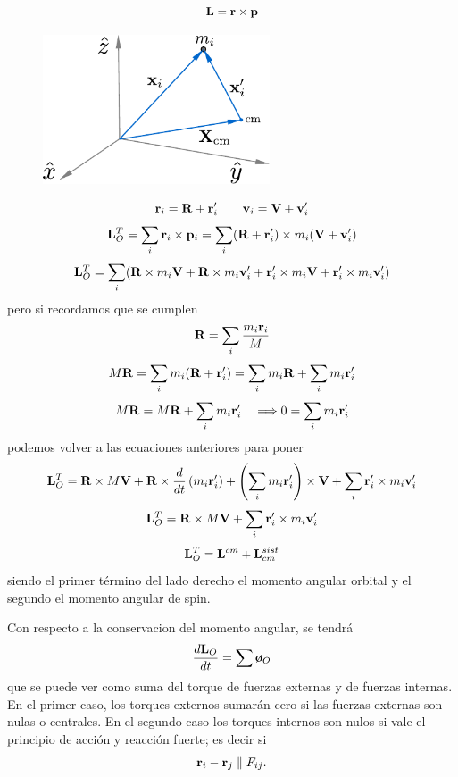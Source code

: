 \documentclass[10pt,oneside]{CBFT_book}
\begin{document}
\[
	\vb{L} = \vb{r} \times \vb{p}
\]
\begin{figure}[hbt]
	\begin{center}
	\includegraphics[width=0.6\textwidth]{images/fig_mc_angularmom.pdf}	
	\end{center}
	\caption{}
\end{figure} 
\[
	\vb{r}_i = \vb{R} + \vb{r}_i' \qquad \vb{v}_i = \vb{V} + \vb{v}_i'
\]
\[
	\vb{L}^T_O = \sum_i \vb{r}_i \times \vb{p}_i = \sum_i (\vb{R} + \vb{r}_i') \times m_i (\vb{V} + \vb{v}_i')
\]
\[
	\vb{L}^T_O = \sum_i ( \vb{R} \times m_i \vb{V}  + \vb{R} \times m_i \vb{v}_i'
	+ \vb{r}_i' \times m_i \vb{V} 	+ \vb{r}_i' \times m_i \vb{v}_i' )
\]
pero si recordamos que se cumplen 
\[
	\vb{R} = \sum_i \frac{m_i \vb{r}_i}{M}
\]
\[
	M\vb{R} = \sum_i m_i (\vb{R} + \vb{r}_i') = \sum_i m_i \vb{R} + \sum_i m_i \vb{r}_i'
\]
\[
	M\vb{R} = M \vb{R} + \sum_i m_i \vb{r}_i' \quad \Longrightarrow 0 = \sum_i m_i \vb{r}_i'
\]
podemos volver a las ecuaciones anteriores para poner
\[
	\vb{L}^T_O = \vb{R} \times M \vb{V}  + \vb{R} \times \frac{d}{dt}\left( m_i \vb{r}_i' \right)
	+ \left( \sum_i m_i \vb{r}_i' \right) \times \vb{V} + \sum_i \vb{r}_i' \times m_i \vb{v}_i'
\]
\[
	\vb{L}^T_O = \vb{R} \times M \vb{V}  + \sum_i \vb{r}_i' \times m_i \vb{v}_i'
\]
\[
	\vb{L}^T_O = \vb{L}^{cm} + \vb{L}^{sist}_{cm}
\]
siendo el primer término del lado derecho el momento angular orbital y el segundo el momento angular
de spin.

Con respecto a la conservacion del momento angular, se tendrá
\[
	\dtot{\vb{L}_O}{t} = \sum \vb{\tau}_O
\]
que se puede ver como suma del torque de fuerzas externas y de fuerzas internas. En el primer caso,
los torques externos sumarán cero si las fuerzas externas son nulas o centrales.
En el segundo caso los torques internos son nulos si vale el principio de acción y reacción fuerte;
es decir si
\[
	\vb{r}_i - \vb{r}_j \parallel F_{ij}.
\]

\end{document}

